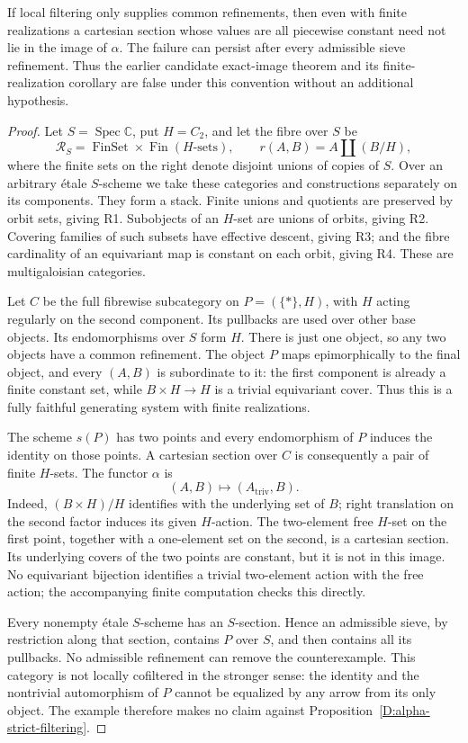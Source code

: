 \begin{proposition}
\label{D:alpha-common-refinement}
If local filtering only supplies common refinements, then even with
finite realizations a cartesian section whose values are all
piecewise constant need not lie in the image of $\alpha$.
The failure can persist after every admissible sieve refinement.
Thus the earlier candidate exact-image theorem and its finite-realization
corollary are false under this convention without an additional hypothesis.
\end{proposition}
\begin{proof}
Let $S=\operatorname{Spec}\mathbb C$, put $H=C_2$, and let the fibre
over $S$ be
\[
 \mathscr R_S=\operatorname{FinSet}\times\operatorname{Fin}(H\text{-sets}),
 \qquad r(A,B)=A\amalg(B/H),
\]
where the finite sets on the right denote disjoint unions of copies
of $S$. Over an arbitrary \'etale $S$-scheme we take these categories
and constructions separately on its components. They form a stack.
Finite unions and quotients are preserved by orbit sets, giving R1.
Subobjects of an $H$-set are unions of orbits, giving R2. Covering
families of such subsets have effective descent, giving R3; and
the fibre cardinality of an equivariant map is constant on each
orbit, giving R4. These are multigaloisian categories.

Let $C$ be the full fibrewise subcategory on
$P=(\{*\},H)$, with $H$ acting regularly on the second component.
Its pullbacks are used over other base objects. Its endomorphisms
over $S$ form $H$. There is just one object, so any two objects
have a common refinement. The object $P$ maps epimorphically to
the final object, and every $(A,B)$ is subordinate to it: the first
component is already a finite constant set, while
$B\times H\to H$ is a trivial equivariant cover. Thus this is
a fully faithful generating system with finite realizations.

The scheme $s(P)$ has two points and every endomorphism of $P$
induces the identity on those points. A cartesian section over $C$
is consequently a pair of finite $H$-sets. The functor $\alpha$ is
\[
 (A,B)\longmapsto(A_{\mathrm{triv}},B).
\]
Indeed, $(B\times H)/H$ identifies with the underlying set of $B$;
right translation on the second factor induces its given $H$-action.
The two-element free $H$-set on the first point, together with a
one-element set on the second, is a cartesian section. Its underlying
covers of the two points are constant, but it is not in this image.
No equivariant bijection identifies a trivial two-element action
with the free action; the accompanying finite computation checks
this directly.

Every nonempty \'etale $S$-scheme has an $S$-section. Hence an
admissible sieve, by restriction along that section, contains $P$
over $S$, and then contains all its pullbacks. No admissible
refinement can remove the counterexample. This category is not
locally cofiltered in the stronger sense: the identity and the
nontrivial automorphism of $P$ cannot be equalized by any arrow
from its only object. The example therefore makes no claim against
Proposition~\ref{D:alpha-strict-filtering}.
\end{proof}


